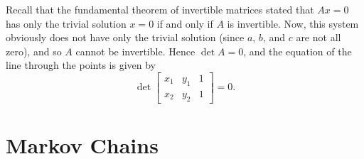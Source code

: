 \documentclass[10pt, a4paper]{amsart}
\theoremstyle{definition}
\theoremstyle{remark}
\begin{document}
Recall that the fundamental theorem of invertible matrices stated that $ Ax = 0 $ has only the trivial solution $ x = 0 $
if and only if $ A $ is invertible. Now, this system obviously does not have only the trivial solution (since $ a $, $ b $,
and $ c $ are not all zero), and so $ A $ cannot be invertible. Hence $ \det A = 0 $, and the equation
of the line through the points is given by
\begin{displaymath}
  \det \begin{bmatrix} x_1 & y_1 & 1 \\ x_2 & y_2 & 1 \end{bmatrix} = 0.
\end{displaymath}

\section{Markov Chains}
\end{document}
